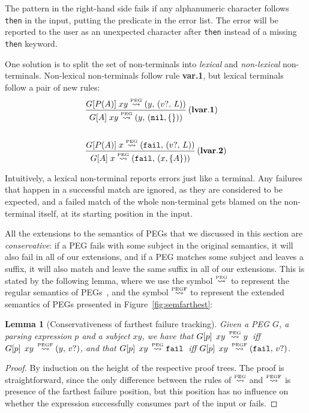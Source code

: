 \documentclass[3p,12pt,singlecolumn]{elsarticle}
\newcommand{\mylabel}[1]{\, \mathbf{(#1)}}
\newcommand{\Lp}{\stackrel{\mbox{\tiny{PEG}}}{\leadsto}}
\newcommand{\Lpp}{\stackrel{\mbox{\tiny{PEGF}}}{\leadsto}}
\newcommand{\Tup}[2]{(#1,\,#2)}
\newcommand{\Ex}{v?}
\newcommand{\Fail}{{\tt fail}}
\newcommand{\Nil}{{\tt nil}}
\newcommand{\List}{L}
\newtheorem{lemma}[proposition]{Lemma}
\newcommand{\Peg}[2]{#1[#2]}
\newcommand{\Pgg}[1]{\Peg{G}{#1}}
\newcommand{\Mat}[2]{#1\;\,#2\,}
\newcommand{\Matg}[2]{\Mat{\Pgg{#1}}{#2}}
\begin{document}
The pattern in the right-hand side fails if any alphanumeric
character follows {\tt then} in the input, putting the
predicate in the error list. The error will be reported to
the user as an unexpected character after {\tt then}
instead of a missing {\tt then} keyword.

One solution is to split the set of non-terminals into
{\em lexical} and {\em non-lexical} non-terminals.
Non-lexical non-terminals follow rule {\bf var.1}, but
lexical terminals follow a pair of new rules:
\begin{align*}
& 
{\frac{G[P(A)] \; xy \Lp \Tup{y}{\Tup{\Ex}{\List}}}
      {G[A] \; xy \Lp \Tup{y}{(\Nil,\{\})}}} \mylabel{lvar.1}\\ \\
& 
{\frac{G[P(A)] \; x \Lp \Tup{\Fail}{\Tup{\Ex}{\List}}}
      {G[A] \; x \Lp \Tup{\Fail}{(x, \{ A \})}}} \mylabel{lvar.2}
\end{align*}

Intuitively, a lexical non-terminal reports errors just like
a terminal. Any failures that happen in a successful match
are ignored, as they are considered to be expected, and a failed
match of the whole non-terminal gets blamed on the
non-terminal itself, at its starting position in the input.

All the extensions to the semantics of PEGs that we discussed
in this section are {\em conservative}: if a PEG fails with
some subject in the original semantics, it will also fail
in all of our extensions, and if a PEG matches some subject
and leaves a suffix, it will also match and leave the same
suffix in all of our extensions. This is stated by the
following lemma, where we use the symbol $\Lp$ to represent
the regular semantics of PEGs~\cite{mascarenhas2014}, and the symbol $\Lpp$ to represent
the extended semantics of PEGs presented in Figure~\ref{fig:semfarthest}:
\begin{lemma}[Conservativeness of farthest failure tracking]
Given a PEG $G$, a parsing expression $p$ and a subject $xy$, we have that 
$\Matg{p}{xy} \Lp y$ \,iff\; $\Matg{p}{xy} \Lpp \Tup{y}{\Ex}$,
and that 
$\Matg{p}{xy} \Lp \Fail$ \,iff\; $\Matg{p}{xy} \Lpp \Tup{\Fail}{\Ex}$.
\end{lemma}
\begin{proof}
By induction on the height of the respective proof trees. 
The proof is straightforward, since the only difference
between the rules of $\Lp$ and $\Lpp$ is presence of
the farthest failure position, but this position has
no influence on whether the expression successfully
consumes part of the input or fails.
\end{proof}
\end{document}
